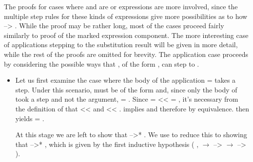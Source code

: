 \documentclass[12pt]{report}
\begin{document}
 The proofs for cases where  and  are  or 
expressions are more involved, since the multiple step rules for
these kinds of expressions give more possibilities as to how  -->
. While the proof may be rather long, most of the cases proceed
fairly similarly to proof of the marked expression component. The
more interesting case of applications stepping to the substitution
result will be given in more detail, while the rest of the proofs are
omitted for brevity. The application case proceeds by considering the
possible ways that , of the form   , can step to
.



\begin{itemize}
\item  Let us first examine the case where the body of the application
     =    takes a step. Under this scenario,  must
    be of the form    and, since only the body of 
    took a step and not the argument,  = . Since  = 
      <<    = , it's necessary from the
    definition of  that  <<  and  <<
    .   implies   and therefore 
     by equivalence.  then yields 
    = .


    At this stage we are left to show that    -->* 
     . We use  to reduce this to
    showing that  -->* , which is given by the first
    inductive hypothesis (\coqdockw{\ensuremath{\forall}} ,   \ensuremath{\rightarrow}  -->  \ensuremath{\rightarrow}
     --> ).




\end{itemize}
\end{document}
